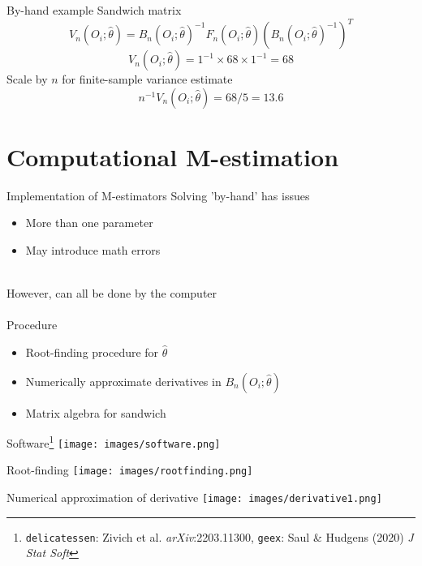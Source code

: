 \documentclass{beamer}
\begin{document}
\begin{frame}{By-hand example}
	Sandwich matrix
	\[ V_n(O_i; \hat{\theta}) = B_n(O_i; \hat{\theta})^{-1} F_n(O_i; \hat{\theta})
	\left(B_n(O_i; \hat{\theta})^{-1}\right)^T\]
	\[ V_n(O_i; \hat{\theta}) = 1^{-1} \times 68 \times 1^{-1} = 68\]
	Scale by $n$ for finite-sample variance estimate
	\[ n^{-1} V_n(O_i; \hat{\theta}) = 68 / 5 = 13.6\]	
\end{frame}

\section{Computational M-estimation}

\begin{frame}{Implementation of M-estimators}
	Solving 'by-hand' has issues
	\begin{itemize}
		\item More than one parameter
		\item May introduce math errors
	\end{itemize}~\\
	However, can all be done by the computer\\~\\
	Procedure
	\begin{itemize}
		\item Root-finding procedure for $\hat{\theta}$
		\item Numerically approximate derivatives in $B_n(O_i; \hat{\theta})$
		\item Matrix algebra for sandwich
	\end{itemize}
\end{frame}

\begin{frame}{Software\footnote[frame]{\texttt{delicatessen}: Zivich et al. \textit{arXiv}:2203.11300, \texttt{geex}: Saul \& Hudgens (2020) \textit{J Stat Soft}}}
	\centering
	\texttt{[image: images/software.png]}
\end{frame}

\begin{frame}{Root-finding}
	\centering
	\texttt{[image: images/rootfinding.png]}
\end{frame}

\begin{frame}{Numerical approximation of derivative}
	\centering
	\texttt{[image: images/derivative1.png]}
\end{frame}
\end{document}
